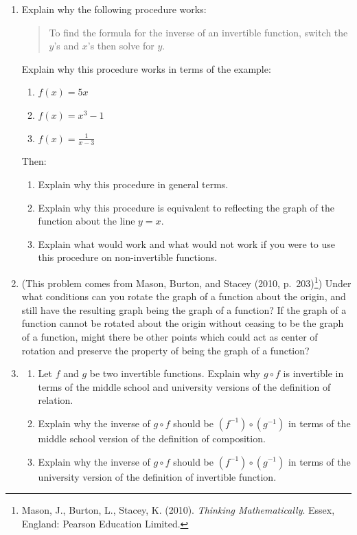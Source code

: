 \documentclass[11pt]{article}
\theoremstyle{definition}
\begin{document}
\begin{enumerate}[resume]	
\item 
Explain why the following procedure works: 

\begin{quote}To find the formula for the inverse of an invertible function, switch the $y$'s and $x$'s then solve for $y$. \end{quote}

Explain why this procedure works in terms of the example:
	\begin{enumerate}
	\item $f(x) = 5x$
	\item $f(x) = x^3 -1$
	\item $f(x) = \frac{1}{x-3}$
	\end{enumerate}
Then:
	\begin{enumerate}[resume] 
	\item Explain why this procedure in general terms.
	\item Explain why this procedure is equivalent to reflecting the graph of the function about the line $y=x$.
	\item Explain what would work and what would not work if you were to use this procedure on non-invertible functions.
	\end{enumerate}
	
\item %
(This problem comes from Mason, Burton, and Stacey (2010, p.~203)\footnote{Mason, J., Burton, L., Stacey, K. (2010). {\it Thinking Mathematically}. Essex, England: Pearson Education Limited.}) Under what conditions can you rotate the graph of a function about the origin, and still have the resulting graph being the graph of a function? If the graph of a function cannot be rotated about the origin without ceasing to be the graph of a function, might there be other points which could act as center of rotation and preserve the property of being the graph of a function?

\item %
	\begin{enumerate}
	\item Let $f$ and $g$ be two invertible functions.
	Explain why $g\circ f$ is invertible in terms of the middle school and university versions of the definition of relation.
	\item Explain why the inverse of $g\circ f$ should be $(f^{-1})\circ (g^{-1})$ in terms of the middle school version of the definition of composition.
	\item Explain why the inverse of $g\circ f$ should be $(f^{-1})\circ (g^{-1})$ in terms of the university version of the definition of invertible function.
	\end{enumerate}
	

\end{enumerate}
\end{document}
